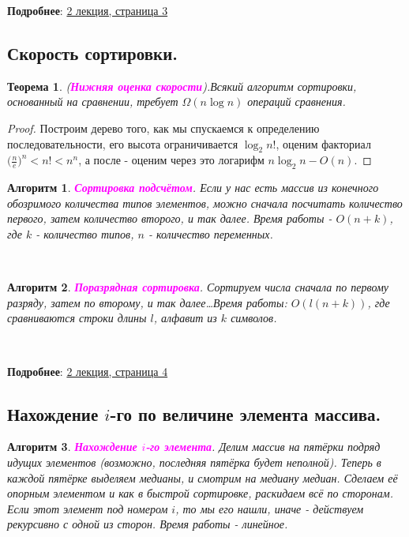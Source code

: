\documentclass[a4paper]{article}
\theoremstyle{indented}
\newtheorem{theorem}{Теорема}
\newtheorem{alg}{Алгоритм}
\theoremstyle{definition}
\theoremstyle{remark}
\begin{document}
\textbf{Подробнее}: \href{https://users.math-cs.spbu.ru/~okhotin/teaching/algorithms_2020/okhotin_algorithms_2020_l2.pdf}{2 лекция, страница 3}

\subsection{Скорость сортировки.} 
 
\begin{theorem}
    (\textcolor{magenta}{\hypertarget{t2.5}{\textbf{Нижняя оценка скорости}}}).Всякий алгоритм сортировки, основанный на сравнении, требует $\Omega (n\log n)$ операций сравнения.
\end{theorem}

\begin{proof}
    Построим дерево того, как мы спускаемся к определению последовательности, его высота ограничивается $\log_2n!$, оценим факториал $\biggl(\frac{n}{e}\biggr)^n<n!<n^n$, а после - оценим через это логарифм $n\log_2n - O(n)$. 
\end{proof}

\begin{alg}
    \textcolor{magenta}{\hypertarget{t3}{\textbf{Сортировка подсчётом}}}. Если у нас есть массив из конечного обозримого количества типов элементов, можно сначала посчитать количество первого, затем количество второго, и так далее. Время работы - $O(n+k)$, где $k$ - количество типов, $n$ - количество переменных.
\end{alg} \ 

\begin{alg}
    \textcolor{magenta}{\hypertarget{t4}{\textbf{Поразрядная сортировка}}}. Сортируем числа сначала по первому разряду, затем по второму, и так далее\dots Время работы: $O(l(n+k))$, где сравниваются строки длины $l$, алфавит из $k$ символов.
\end{alg}  \ 

\textbf{Подробнее}: \href{https://users.math-cs.spbu.ru/~okhotin/teaching/algorithms_2020/okhotin_algorithms_2020_l2.pdf}{2 лекция, страница 4}

\subsection{Нахождение $i$-го по величине элемента массива.} 

\begin{alg}
    \textcolor{magenta}{\hypertarget{t4}{\textbf{Нахождение $i$-го элемента}}}. Делим массив на пятёрки подряд идущих элементов (возможно, последняя пятёрка будет неполной). Теперь в каждой пятёрке выделяем медианы, и смотрим на медиану медиан. Сделаем её опорным элементом и как в быстрой сортировке, раскидаем всё по сторонам. Если этот элемент под номером $i$, то мы его нашли, иначе - действуем рекурсивно с одной из сторон. Время работы - линейное.
\end{alg} \
\end{document}
